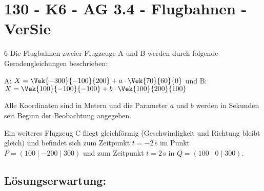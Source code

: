 \section{130 - K6 - AG 3.4 - Flugbahnen - VerSie}

\begin{langesbeispiel} \item[6] %
Die Flugbahnen zweier Flugzeuge A und B werden durch folgende Geradengleichungen beschrieben:

A: $X=\Vek{-300}{-100}{200}+a\cdot\Vek{70}{60}{0}$ und B: $X=\Vek{100}{-100}{-100}+b\cdot\Vek{100}{200}{100}$

Alle Koordinaten sind in Metern und die Parameter $a$ und $b$ werden in Sekunden seit Beginn der Beobachtung angegeben.%

\begin{aufgabenstellung}
\item %


\item %


\item Ein weiteres Flugzeug C fliegt gleichförmig (Geschwindigkeit und Richtung bleibt gleich) und befindet sich zum Zeitpunkt $t=-2$\,s im Punkt\\ 
	$P=(100\mid -200\mid 300)$ und zum Zeitpunkt $t=2$\,s in $Q=(100\mid 0\mid 300)$.%


\end{aufgabenstellung}

\begin{loesung}
\item \subsection{Lösungserwartung:} 

\end{loesung}
\end{langesbeispiel}
